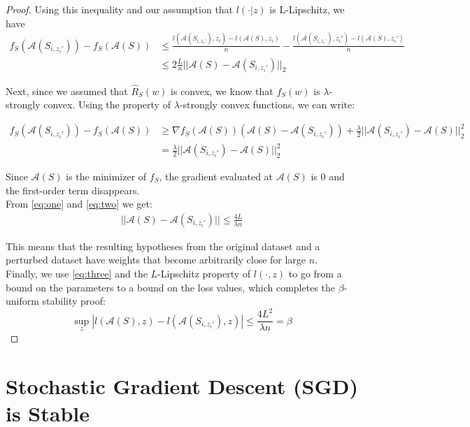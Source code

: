 \documentclass{article}
\begin{document}
\begin{proof}
Using this inequality and our assumption that $l(\cdot|z)$ is L-Lipschitz, we have
\begin{align}
f_S(\mathcal{A}(S_{i,z_i'})) - f_S(\mathcal{A}(S)) &\leq \frac{l(\mathcal{A}(S_{i,z_i'}), z_i) - l(\mathcal{A}(S), z_i)}{n} - \frac{l(\mathcal{A}(S_{i,z_i'}), z_i') - l(\mathcal{A}(S),z_i')}{n} \nonumber\\
&\leq 2\frac{L}{n}||\mathcal{A}(S)-\mathcal{A}(S_{i,z_i'})||_2 \label{eq:one}
\end{align}

Next, since we assumed that $\hat{R}_S(w)$ is convex, we know that $f_S(w)$ is $\lambda$-strongly convex. Using the property of $\lambda$-strongly convex functions, we can write:

\begin{align}
    f_S(\mathcal{A}(S_{i,z_i'})) - f_S(\mathcal{A}(S)) &\geq \nabla f_S(\mathcal{A}(S)) (\mathcal{A}(S) - \mathcal{A}(S_{i,z_i'})) +  \frac{\lambda}{2}||\mathcal{A}(S_{i,z_i'}) - \mathcal{A}(S)||_2^2 \\
    &= \frac{\lambda}{2}||\mathcal{A}(S_{i,z_i'}) - \mathcal{A}(S)||_2^2
\label{eq:two}
\end{align}


Since $\mathcal{A}(S)$ is the minimizer of $f_S$, the gradient evaluated at $\mathcal{A}(S)$ is $0$ and the first-order term disappears. \\

From \ref{eq:one} and \ref{eq:two} we get:
\begin{align}
    ||\mathcal{A}(S) - \mathcal{A}(S_{i,z_i'})|| \leq \frac{4L}{\lambda n}
\label{eq:three}
\end{align}

This means that the resulting hypotheses from the original dataset and a perturbed dataset have weights that become arbitrarily close for large $n$.\\

Finally, we use \ref{eq:three} and the $L$-Lipschitz property of $l(\cdot,z)$ to go from a bound on the parameters to a bound on the loss values, which completes the $\beta$-uniform stability proof:
$$\sup_z|l(\mathcal{A}(S), z) - l(\mathcal{A}(S_{i,z_i'}), z)| \leq \frac{4L^2}{\lambda n} = \beta$$
\end{proof}


\section*{Stochastic Gradient Descent (SGD) is Stable}
\end{document}
